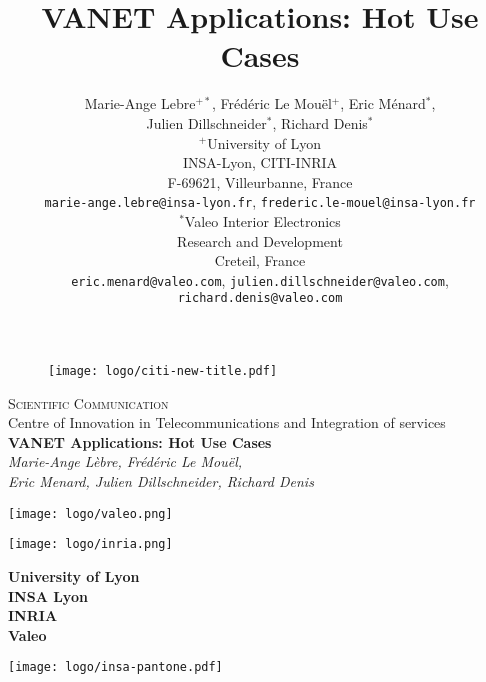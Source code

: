 \documentclass[a4paper]{article}
\begin{document}
\pagestyle{empty}
\begin{center}
\begin{figure}\centering
\texttt{[image: logo/citi-new-title.pdf]}\end{figure}
{\LARGE \textsc{Scientific Communication}} \\
\vspace{0.5cm}
{Centre of Innovation in Telecommunications and Integration of services} \\

\vspace{3cm}
{\Large \textbf{VANET Applications: Hot Use Cases}} \\
\vspace{10pt}
{\large \textit{Marie-Ange Lèbre, Frédéric Le Mouël, \\Eric Menard, Julien Dillschneider, Richard Denis}} \\
\vspace{10pt}

\begin{minipage}{0.8\columnwidth}
\sffamily
\small
\end{minipage}
\end{center}
\vfill
\begin{center}
\texttt{[image: logo/valeo.png]}
\end{center}
\begin{minipage}[b]{0.3\columnwidth}
\texttt{[image: logo/inria.png]}\end{minipage}
\hfill
\begin{minipage}{0.3\columnwidth}
\small
\centering
\textbf{
University of Lyon \\
INSA Lyon \\
INRIA\\
Valeo
}
\end{minipage}
\hfill
\begin{minipage}[b]{0.25\columnwidth}
\texttt{[image: logo/insa-pantone.pdf]}\end{minipage}
\newpage

\title{VANET Applications: Hot Use Cases}

\author{Marie-Ange Lebre$^{+*}$, Frédéric Le Mouël$^{+}$, Eric Ménard$^{*}$,\\
Julien Dillschneider$^{*}$, Richard Denis$^{*}$ \\[10pt]
$^{+}$University of Lyon\\
INSA-Lyon, CITI-INRIA\\
F-69621, Villeurbanne, France\\
\texttt{marie-ange.lebre@insa-lyon.fr}, \texttt{frederic.le-mouel@insa-lyon.fr} \\[10pt]
$^{*}$Valeo Interior Electronics\\
Research and Development\\
Creteil, France\\
\texttt{eric.menard@valeo.com}, \texttt{julien.dillschneider@valeo.com}, \texttt{richard.denis@valeo.com}}
\end{document}
